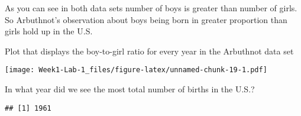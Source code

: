 \documentclass[]{article}
\newenvironment{Shaded}{\begin{snugshade}}{\end{snugshade}}
\newcommand{\DataTypeTok}[1]{\textcolor[rgb]{0.13,0.29,0.53}{#1}}
\newcommand{\KeywordTok}[1]{\textcolor[rgb]{0.13,0.29,0.53}{\textbf{#1}}}
\newcommand{\NormalTok}[1]{#1}
\newcommand{\OperatorTok}[1]{\textcolor[rgb]{0.81,0.36,0.00}{\textbf{#1}}}
\newcommand{\StringTok}[1]{\textcolor[rgb]{0.31,0.60,0.02}{#1}}
\begin{document}
As you can see in both data sets number of boys is greater than number
of girls. So Arbuthnot's observation about boys being born in greater
proportion than girls hold up in the U.S.

Plot that displays the boy-to-girl ratio for every year in the Arbuthnot
data set

\begin{Shaded}
\end{Shaded}

\texttt{[image: Week1-Lab-1\_files/figure-latex/unnamed-chunk-19-1.pdf]}

In what year did we see the most total number of births in the U.S.?

\begin{Shaded}
\end{Shaded}

\begin{verbatim}
## [1] 1961
\end{verbatim}
\end{document}
